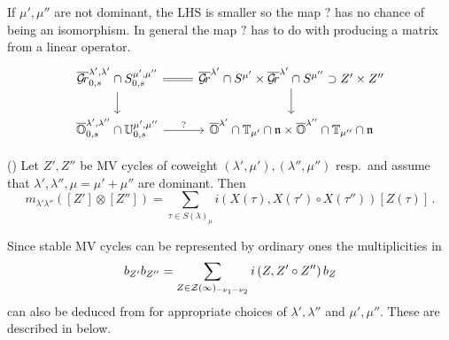 \documentclass[draft]{article}
\begin{document}
\begin{question}
    If $\mu',\mu''$ are not dominant, the LHS is smaller so the map $?$ has no chance of being an isomorphism. In general the map $?$ has to do with producing a matrix from a linear operator. 
    \[
    \begin{tikzcd}
        \overline\Gr^{\lambda',\lambda'}_{0,s}\cap S^{\mu',\mu''}_{0,s} \ar[r,equals]\ar[d] & \overline\Gr^{\lambda'} \cap S^{\mu'} \times \overline\Gr^{\lambda'} \cap S^{\mu''} \supset Z' \times Z'' \ar[d]\\
        \overline\OO^{\lambda',\lambda''}_{0,s} \cap \UU^{\mu',\mu''}_{0,s} \ar[r,"?"] & \overline\OO^{\lambda'}\cap \TT_{\mu'}\cap \n \times \overline\OO^{\lambda''}\cap \TT_{\mu''}\cap \n
    \end{tikzcd}    
    \]
\end{question}
% 
\begin{proposition}(\cite{baumann2019mirkovic})
    Let $Z',Z''$  be MV cycles of coweight $(\lambda',\mu'),(\lambda'',\mu'')$ resp.\ and assume that $\lambda',\lambda'',\mu = \mu' + \mu''$ are dominant. 
    Then 
    \begin{equation}
        \label{eq:tabmult}
        m_{\lambda'\lambda''} ([Z']\otimes[Z'']) 
        = 
        \sum_{\tau\in S(\lambda)_\mu}
        i\left(
            X(\tau), X(\tau')\circ X(\tau'')
        \right) [Z(\tau)]\,. 
    \end{equation}
    

    Since stable MV cycles can be represented by ordinary ones the multiplicities in 
    $$
    b_{Z'}b_{Z''} = \sum_{Z\in\mathcal Z(\infty)_{-\nu_1 - \nu_2}} i \left(
        Z, Z' \circ Z''
    \right) b_Z 
    $$
    can also be deduced from  for appropriate choices of $\lambda',\lambda''$ and $\mu',\mu''$. These are described in  below.
\end{proposition}
% 
\end{document}
